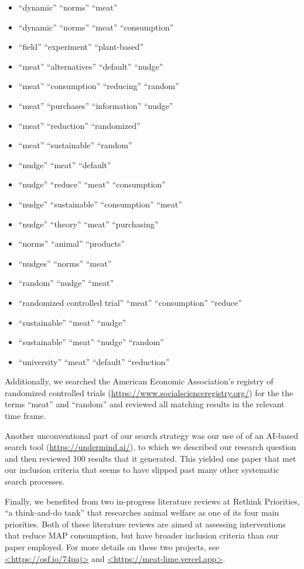 \documentclass[sn-nature,referee,pdflatex]{sn-jnl}
\providecommand{\tightlist}{%
  \setlength{\itemsep}{0pt}\setlength{\parskip}{0pt}}
\begin{document}
\begin{itemize}
\tightlist
\item
  ``dynamic'' ``norms'' ``meat''
\item
  ``dynamic'' ``norms'' ``meat'' ``consumption''
\item
  ``field'' ``experiment'' ``plant-based''
\item
  ``meat'' ``alternatives'' ``default'' ``nudge''
\item
  ``meat'' ``consumption'' ``reducing'' ``random''
\item
  ``meat'' ``purchases'' ``information'' ``nudge''
\item
  ``meat'' ``reduction'' ``randomized''
\item
  ``meat'' ``sustainable'' ``random''
\item
  ``nudge'' ``meat'' ``default''
\item
  ``nudge'' ``reduce'' ``meat'' ``consumption''
\item
  ``nudge'' ``sustainable'' ``consumption'' ``meat''
\item
  ``nudge'' ``theory'' ``meat'' ``purchasing''
\item
  ``norms'' ``animal'' ``products''
\item
  ``nudges'' ``norms'' ``meat''
\item
  ``random'' ``nudge'' ``meat''
\item
  ``randomized controlled trial'' ``meat'' ``consumption'' ``reduce''
\item
  ``sustainable'' ``meat'' ``nudge''
\item
  ``sustainable'' ``meat'' ``nudge'' ``random''
\item
  ``university'' ``meat'' ``default'' ``reduction''
\end{itemize}

Additionally, we searched the American Economic Association's registry
of randomized controlled trials
(\url{https://www.socialscienceregistry.org/}) for the the terms
``meat'' and ``random'' and reviewed all matching results in the
relevant time frame.

Another unconventional part of our search strategy was our use of of an
AI-based search tool (\url{https://undermind.ai/}), to which we
described our research question and then reviewed 100 results that it
generated. This yielded one paper that met our inclusion criteria
\citep{mattson2020} that seems to have slipped past many other
systematic search processes.

Finally, we benefited from two in-progress literature reviews at Rethink
Priorities, ``a think-and-do tank'' that researches animal welfare as
one of its four main priorities. Both of these literature reviews are
aimed at assessing interventions that reduce MAP consumption, but have
broader inclusion criteria than our paper employed. For more details on
these two projects, see \url{<https://osf.io/74paj>} and
\url{<https://meat-lime.vercel.app>}.
\end{document}
